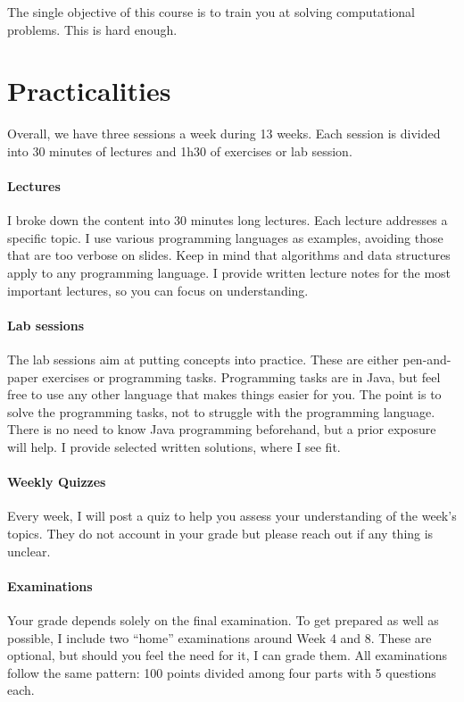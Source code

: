 \documentclass{aldast}
\begin{document}
\begin{takeaway}
  The single objective of this course is to train you at solving
  computational problems. This is hard enough.
\end{takeaway}


\section{Practicalities}
Overall, we have three sessions a week during 13 weeks. Each session
is divided into 30 minutes of lectures and 1h30 of exercises or lab
session.

\paragraph {Lectures}
I broke down the content into 30 minutes long lectures. Each lecture
addresses a specific topic. I use various programming languages as
examples, avoiding those that are too verbose on slides. Keep in mind
that algorithms and data structures apply to any programming
language. I provide written lecture notes for the most important
lectures, so you can focus on understanding.

\paragraph {Lab sessions}
The lab sessions aim at putting concepts into practice. These are
either pen-and-paper exercises or programming tasks. Programming tasks
are in Java, but feel free to use any other language that makes things
easier for you. The point is to solve the programming tasks, not to
struggle with the programming language. There is no need to
know Java programming beforehand, but a prior exposure will help. I
provide selected written solutions, where I see fit.

\paragraph {Weekly Quizzes}
Every week, I will post a quiz to help you assess your understanding
of the week's topics. They do not account in your grade but please
reach out if any thing is unclear.

\paragraph{Examinations}
Your grade depends solely on the final examination. To get prepared as
well as possible, I include two ``home'' examinations around Week 4 and
8. These are optional, but should you feel the need for it, I can
grade them. All examinations follow the same pattern: 100 points
divided among four parts with 5 questions each.
\end{document}
